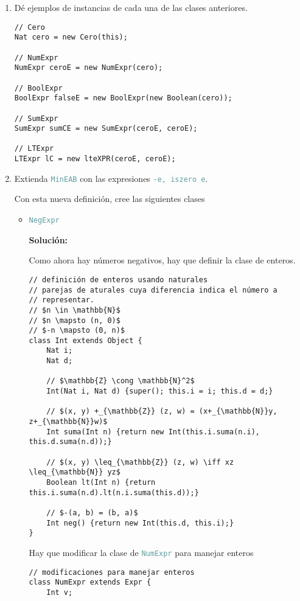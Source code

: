 \documentclass{article}
\newcommand{\tp}[1]{\textcolor{CadetBlue} {\texttt{#1}}}
\newcommand{\tb}[1]{\textcolor{RoyalPurple} {\textbf{#1}}}
\begin{document}
\begin{enumerate}
\begin{enumerate}
\begin{itemize}
            \end{itemize}

            \item Dé ejemplos de instancias de cada una de las clases
            anteriores.

            \begin{verbatim}
// Cero
Nat cero = new Cero(this);

// NumExpr
NumExpr ceroE = new NumExpr(cero);

// BoolExpr
BoolExpr falseE = new BoolExpr(new Boolean(cero));

// SumExpr
SumExpr sumCE = new SumExpr(ceroE, ceroE);

// LTExpr
LTExpr lC = new lteXPR(ceroE, ceroE);
            \end{verbatim}

            \item Extienda \tp{MinEAB} con las expresiones \tp{-e, iszero e}.

            Con esta nueva definición, cree las siguientes clases

            \begin{itemize}
                \item \tp{NegExpr}

                \tb{Solución:}

                Como ahora hay números negativos, hay que definir la clase de
                enteros.

                \begin{verbatim}
// definición de enteros usando naturales
// parejas de aturales cuya diferencia indica el número a
// representar.
// $n \in \mathbb{N}$
// $n \mapsto (n, 0)$
// $-n \mapsto (0, n)$
class Int extends Object {
    Nat i;
    Nat d;

    // $\mathbb{Z} \cong \mathbb{N}^2$
    Int(Nat i, Nat d) {super(); this.i = i; this.d = d;}

    // $(x, y) +_{\mathbb{Z}} (z, w) = (x+_{\mathbb{N}}y, z+_{\mathbb{N}}w)$
    Int suma(Int n) {return new Int(this.i.suma(n.i), this.d.suma(n.d));}

    // $(x, y) \leq_{\mathbb{Z}} (z, w) \iff xz \leq_{\mathbb{N}} yz$
    Boolean lt(Int n) {return this.i.suma(n.d).lt(n.i.suma(this.d));}

    // $-(a, b) = (b, a)$
    Int neg() {return new Int(this.d, this.i);}
}
                \end{verbatim}

                Hay que modificar la clase de \tp{NumExpr} para manejar enteros
                \begin{verbatim}
// modificaciones para manejar enteros
class NumExpr extends Expr {
    Int v;


\end{verbatim}
\end{itemize}
\end{enumerate}
\end{enumerate}
\end{document}
